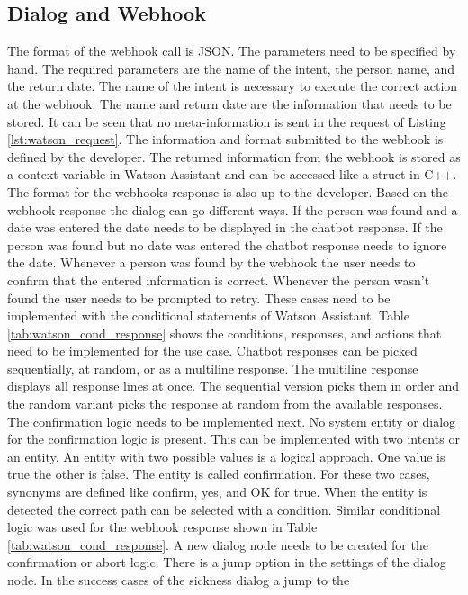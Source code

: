 \subsection{Dialog and Webhook}
The format of the webhook call is JSON.
The parameters need to be specified by hand.
The required parameters are the name of the intent, the person name, and the 
return date.
The name of the intent is necessary to execute the correct action at the webhook.
The name and return date are the information that needs to be stored.
It can be seen that no meta-information is sent in the request of Listing \ref{lst:watson_request}.
The information and format submitted to the webhook is defined by the developer.
The returned information from the webhook is stored as a context variable in Watson Assistant and can be accessed like a struct in C++. 
The format for the webhooks response is also up to the developer.
Based on the webhook response the dialog can go different ways.
If the person was found and a date was entered the date needs to be displayed in the chatbot response.
If the person was found but no date was entered the chatbot response needs to ignore the date.
Whenever a person was found by the webhook the user needs to confirm that the entered information is correct.
Whenever the person wasn't found the user needs to be prompted to retry.
These cases need to be implemented with the conditional statements of Watson Assistant.
Table \ref{tab:watson_cond_response} shows the conditions, responses, and actions that need to be implemented for the use case.
Chatbot responses can be picked sequentially, at random, or as a multiline response.
The multiline response displays all response lines at once.
The sequential version picks them in order and the random variant picks the response at random from 
the available responses.
The confirmation logic needs to be implemented next.
No system entity or dialog for the confirmation logic is present.
This can be implemented with two intents or an entity.
An entity with two possible values is a logical approach.
One value is true the other is false.
The entity is called confirmation.
For these two cases, synonyms are defined like confirm, yes, and OK for true.
When the entity is detected the correct path can be selected with a condition.
Similar conditional logic was used for the webhook response shown 
in Table \ref{tab:watson_cond_response}.
A new dialog node needs to be created for the confirmation or abort 
logic.
There is a jump option in the settings of the dialog node.
In the success cases of the sickness dialog a jump to the 
